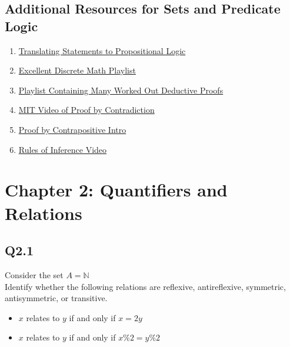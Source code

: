 \documentclass{article}
\begin{document}
\subsection*{Additional Resources for Sets and Predicate Logic}
\begin{enumerate}
    \item \href{https://www.youtube.com/watch?v=A2k3ulOJ3u4}{Translating Statements to Propositional Logic} 
    \item \href{https://www.youtube.com/watch?v=A3Ffwsnad0k&list=PLl-gb0E4MII28GykmtuBXNUNoej-vY5Rz}{Excellent Discrete Math Playlist}
    \item \href{https://www.youtube.com/watch?v=6o1kLNEE-d4&list=PLF_J2w5w0Z3E7jZGz-23P6WrKxokXBkHC}{Playlist Containing Many Worked Out Deductive Proofs}
    \item \href{https://www.youtube.com/watch?v=CpW0ZJ7i0oc}{MIT Video of Proof by Contradiction}
    \item \href{https://www.youtube.com/watch?v=0YqZIHFmVzg}{Proof by Contrapositive Intro}
    \item \href{https://www.youtube.com/watch?v=8DW0K3mnc-0}{Rules of Inference Video}
\end{enumerate}
\newpage
{}
\section*{Chapter 2: Quantifiers and Relations}
\subsection*{Q2.1}
Consider the set $A=\mathbb{N}$
\\ Identify whether the following relations are reflexive, antireflexive, symmetric, antisymmetric, or transitive.
\begin{itemize}
    \item $x$ relates to $y$ if and only if $x=2y$ 
    \item $x$ relates to $y$ if and only if $x\%2=y\%2$
\end{itemize}
\newpage
{}
\end{document}
